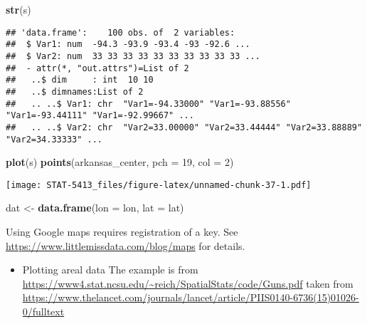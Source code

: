 \documentclass[]{book}
\newenvironment{Shaded}{\begin{snugshade}}{\end{snugshade}}
\newcommand{\DataTypeTok}[1]{\textcolor[rgb]{0.13,0.29,0.53}{#1}}
\newcommand{\DecValTok}[1]{\textcolor[rgb]{0.00,0.00,0.81}{#1}}
\newcommand{\KeywordTok}[1]{\textcolor[rgb]{0.13,0.29,0.53}{\textbf{#1}}}
\newcommand{\NormalTok}[1]{#1}
\newcommand{\StringTok}[1]{\textcolor[rgb]{0.31,0.60,0.02}{#1}}
\providecommand{\tightlist}{%
  \setlength{\itemsep}{0pt}\setlength{\parskip}{0pt}}
\begin{document}
\begin{Shaded}
\begin{Highlighting}[]
\KeywordTok{str}\NormalTok{(s)}
\end{Highlighting}
\end{Shaded}

\begin{verbatim}
## 'data.frame':    100 obs. of  2 variables:
##  $ Var1: num  -94.3 -93.9 -93.4 -93 -92.6 ...
##  $ Var2: num  33 33 33 33 33 33 33 33 33 33 ...
##  - attr(*, "out.attrs")=List of 2
##   ..$ dim     : int  10 10
##   ..$ dimnames:List of 2
##   .. ..$ Var1: chr  "Var1=-94.33000" "Var1=-93.88556" "Var1=-93.44111" "Var1=-92.99667" ...
##   .. ..$ Var2: chr  "Var2=33.00000" "Var2=33.44444" "Var2=33.88889" "Var2=34.33333" ...
\end{verbatim}

\begin{Shaded}
\begin{Highlighting}[]
\KeywordTok{plot}\NormalTok{(s)}
\KeywordTok{points}\NormalTok{(arkansas_center, }\DataTypeTok{pch =} \DecValTok{19}\NormalTok{, }\DataTypeTok{col =} \DecValTok{2}\NormalTok{)}
\end{Highlighting}
\end{Shaded}

\texttt{[image: STAT-5413\_files/figure-latex/unnamed-chunk-37-1.pdf]}

\begin{Shaded}
\begin{Highlighting}[]
\NormalTok{dat <-}\StringTok{ }\KeywordTok{data.frame}\NormalTok{(}\DataTypeTok{lon =}\NormalTok{ lon, }\DataTypeTok{lat =}\NormalTok{ lat)}
\end{Highlighting}
\end{Shaded}

Using Google maps requires registration of a key. See \url{https://www.littlemissdata.com/blog/maps} for details.

\begin{itemize}
\tightlist
\item
  Plotting areal data
  The example is from \url{https://www4.stat.ncsu.edu/~reich/SpatialStats/code/Guns.pdf} taken from \url{https://www.thelancet.com/journals/lancet/article/PIIS0140-6736(15)01026-0/fulltext}
\end{itemize}
\end{document}
